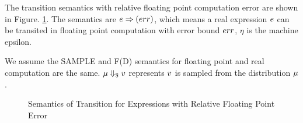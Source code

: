\documentclass[a4paper,11pt]{article}
\begin{document}
The transition semantics with relative floating point computation error are shown in Figure. \ref{fig_trans_semantics_exp}. The semantics are $e \Rightarrow (err)$, which means a real expression $e$ can be transited in floating point computation with error bound $err$, $\eta$ is the machine epsilon.

We assume the SAMPLE and F(D) semantics for floating point and real computation are the same. $\mu \Downarrow_{\$} v$ represents $v$ is sampled from the distribution $\mu$.

\begin{figure}
\caption{Semantics of Transition for Expressions with Relative Floating Point Error}
\label{fig_trans_semantics_exp}
\end{figure}
\end{document}
